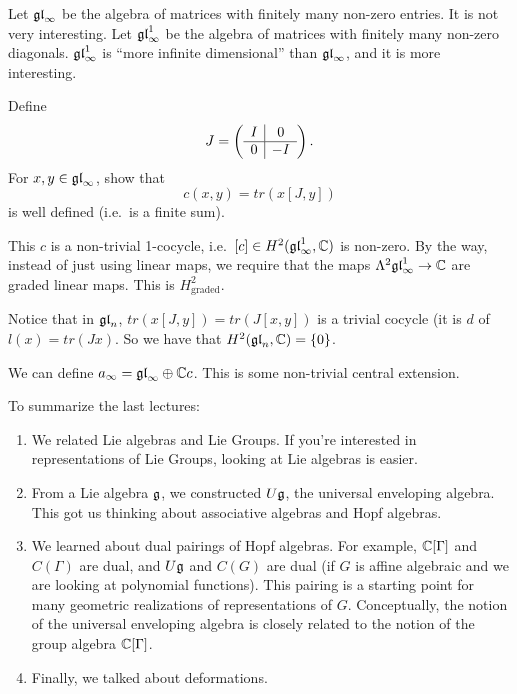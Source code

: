  \begin{example}
 Let $\mathfrak{gl}_{\infty}$ be the algebra of matrices with
 finitely many non-zero entries. It is not very interesting. Let $\mathfrak{gl}_{\infty}^{1}$ be
 the algebra of matrices with finitely many non-zero diagonals. $\mathfrak{gl}_\infty^1$ is
 ``more infinite dimensional'' than $\mathfrak{gl}_\infty$, and it is more interesting.
 \begin{exercise} Define
  \[
  J=\left(
  \begin{array}
  [c]{c|c}%
  I & 0\\\hline 0 & -I
  \end{array}
  \right).
  \]
   For $x,y\in\mathfrak{gl}_{\infty}$, show that
   \[
   c(x,y)=tr(x[J,y])
   \]
   is well defined (i.e.\ is a finite sum).
 \end{exercise}
 This $c$ is a non-trivial 1-cocycle, i.e.\ $[c]\in H^{2}(\mathfrak{gl}_{\infty}^{1},\mathbb{C})$ is
 non-zero. By the way, instead of just using linear maps, we require that the maps
 $\Lambda^{2}\mathfrak{gl}_{\infty} ^{1}\rightarrow\mathbb{C}$ are graded linear maps. This is
 $H_{\text{graded}}^{2}$.

 Notice that in $\mathfrak{gl}_{n}$, $tr(x[J,y]) = tr(J[x,y])$ is a trivial cocycle (it is $d$ of
 $l(x)=tr(Jx)$. So we have that $H^{2}(\mathfrak{gl}_{n},\mathbb{C})=\{0\}$.

 We can define $a_{\infty}= \mathfrak{gl}_{\infty}\oplus\mathbb{C} c$. This is some non-trivial central
 extension.
 \end{example}

 To summarize the last lectures:
 \begin{enumerate}
 \item We related Lie algebras and Lie Groups. If you're interested in
 representations of Lie Groups, looking at Lie algebras is easier.

 \item From a Lie algebra $\mathfrak{g}$, we constructed $U\mathfrak{g}$, the universal enveloping algebra.
 This got us thinking about associative algebras and Hopf algebras.

 \item We learned about dual pairings of Hopf algebras. For example, $\mathbb{C}[\Gamma]$ and
 $C(\Gamma)$ are dual, and $U\mathfrak{g}$ and $C(G)$ are dual (if $G$ is affine algebraic and
 we are looking at polynomial functions). This pairing is a starting point for many
 geometric realizations of representations of $G$. Conceptually, the notion of the
 universal enveloping algebra is closely related to the notion of the group algebra
 $\mathbb{C}[\Gamma]$.

 \item Finally, we talked about deformations.
 \end{enumerate}

